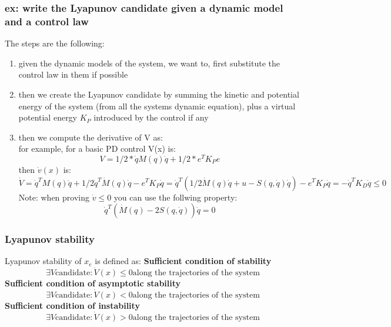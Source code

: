 \documentclass[a4paper,12pt]{article}
\begin{document}
\subsubsection{ex: write the Lyapunov candidate given a dynamic model
and a control law}
The steps are the following:
\begin{enumerate}
    \item given the dynamic models of the system, we want 
    to, first substitute the control law in them if possible
    \item then we create the Lyapunov candidate by summing 
    the kinetic and potential energy of the system 
    (from all the systems dynamic equation), plus a virtual potential energy
    $K_P$ introduced by the control if any 
    \item then we compute the derivative of V as:\\
    for example, for a basic PD control V(x) is: \begin{equation}
    V=1/2*\dot{q}M(q)\dot{q}+1/2*e^TK_Pe
    \end{equation}
    then $\dot{v}(x)$ is:\begin{equation}
    \dot{V}=\dot{q}^TM(q)\ddot{q}+1/2\dot{q}^T\dot{M}(q)\dot{q}-
    e^TK_P\dot{q} = \dot{q}^T(1/2\dot{M}(q)\dot{q}+u-S(q,\dot{q})\dot{q}) -
    e^TK_P\dot{q} = -\dot{q}^TK_D\dot{q} \leq 0
    \end{equation}
    Note: when proving $\dot{v}\leq0$ you can use the follwing 
    property: \begin{equation}
    \dot{q}^T(\dot{M}(q)-2S(q,\dot{q}))\dot{q}=0
    \end{equation}
\end{enumerate}
    \subsubsection{Lyapunov stability}
Lyapunov stability of $x_e$ is defined as:
\textbf{Sufficient condition of stability}
\begin{equation}
    \exists V \text{candidate} : \dot{V}(x) \leq 0 \text{along the trajectories of the system}
\end{equation}
\textbf{Sufficient condition of asymptotic stability}
\begin{equation}
    \exists V \text{candidate} : \dot{V}(x) < 0 \text{along the trajectories of the system}
\end{equation}
\textbf{Sufficient condition of instability}
\begin{equation}
    \exists V \text{candidate} : \dot{V}(x) > 0 \text{along the trajectories of the system}
\end{equation}
\end{document}
